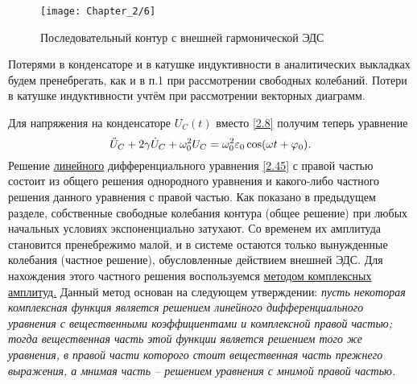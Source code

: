 \begin{figure}[h!]
	\centering
	\texttt{[image: Chapter\_2/6]}
	\caption{Последовательный контур с внешней гармонической ЭДС}
\end{figure}

Потерями в конденсаторе и в катушке индуктивности в аналитических выкладках будем пренебрегать, как и в п.1 при рассмотрении свободных колебаний. Потери в катушке индуктивности учтём при рассмотрении векторных диаграмм.


Для напряжения на конденсаторе $U_C(t)$ вместо \eqref{2.8} получим теперь уравнение
\begin{equation}\eqmark{2.45}
\ddot{U}_C+2\gamma \dot{U}_C+\omega_0^2U_C=\omega_0^2\varepsilon_0\cos(\omega t+ \varphi_0).
\end{equation}
Решение \underline{линейного} дифференциального уравнения \eqref{2.45} с правой частью состоит из общего решения однородного уравнения и какого-либо частного решения данного уравнения с правой частью. Как показано в предыдущем разделе, собственные свободные колебания контура (общее решение) при любых начальных условиях экспоненциально затухают. Со временем их амплитуда становится пренебрежимо малой, и в системе остаются только вынужденные колебания (частное решение), обусловленные действием внешней ЭДС. Для нахождения этого частного решения воспользуемся \underline{методом комплексных амплитуд.} Данный метод основан на следующем утверждении: \emph{пусть некоторая комплексная функция является решением линейного дифференциального уравнения с вещественными коэффициентами и комплексной правой частью; тогда вещественная часть этой функции является решением того же уравнения, в правой части которого стоит вещественная часть прежнего выражения, а мнимая часть – решением уравнения с мнимой правой частью.}

